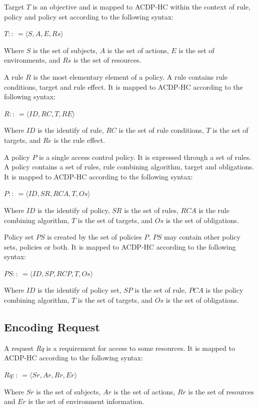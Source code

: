 \documentclass[conference]{IEEEtran}
\begin{document}
Target $T$ is an objective and is mapped to ACDP-HC within the context of rule, policy and policy set according to the following syntax:

$T ::\:= \langle S, A, E, Rs \rangle $

Where $S$ is the set of subjects, $A$ is the set of actions, $E$ is the set of environments, and $Rs$ is the set of resources.

A rule $R$ is the most elementary element of a policy. 
A rule contains rule conditions, target and rule effect. 
It is mapped to ACDP-HC according to the following syntax:

$R ::\:= \langle ID, RC, T, RE \rangle$

Where $ID$ is the identify of rule, $RC$ is the set of rule conditions, $T$ is the set of targets, and $Re$ is the rule effect.

A policy $P$ is a single access control policy. 
It is expressed through a set of rules. 
A policy contains a set of rules, rule combining algorithm, target and obligations.
It is mapped to ACDP-HC according to the following syntax:

$P ::\: = \langle ID, SR, RCA, T, Os \rangle$

Where $ID$ is the identify of policy, $SR$ is the set of rules, $RCA$ is the rule combining algorithm, $T$ is the set of targets, and $Os$ is the set of obligations.

Policy set $PS$ is created by the set of policies $P$. $PS$ may contain other policy sets, policies or both. 
It is mapped to ACDP-HC according to the following syntax:

$PS ::\: = \langle ID, SP, RCP, T, Os \rangle$

Where $ID$ is the identify of policy set, $SP$ is the set of rule, $PCA$ is the policy combining algorithm, $T$ is the set of targets, and $Os$ is the set of obligations.

\subsection{Encoding Request}\label{Back:request}

A request \textit{Rq} is a requirement for access to some resources. It is mapped to ACDP-HC according to the following syntax:

$Rq ::\: = \langle Sr, Ar, Rr, Er \rangle$

Where $Sr$ is the set of subjects, $Ar$ is the set of actions, $Rr$ is the set of resources and $Er$ is the set of environment information.
\end{document}
